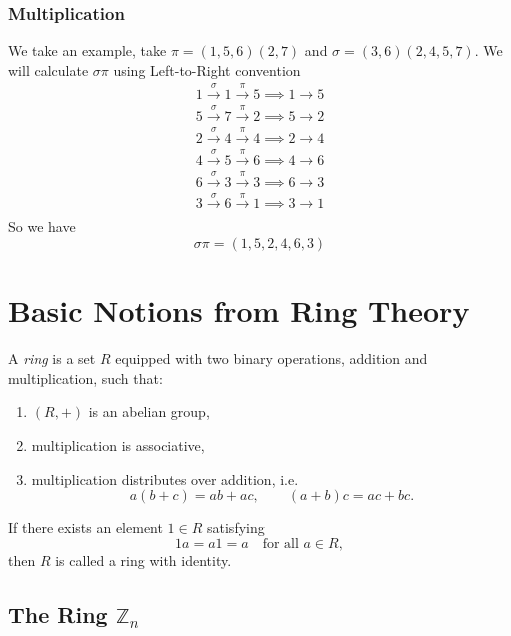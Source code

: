 \documentclass[a4paper,12pt]{article}
\theoremstyle{definition}
\begin{document}
\subsubsection*{Multiplication}
We take an example, take $\pi = (1,5,6)(2,7)$ and $\sigma = (3,6)(2,4,5,7)$. We will calculate $\sigma\pi$ using Left-to-Right convention
\begin{gather*}
1 \xrightarrow{\sigma} 1 \xrightarrow{\pi} 5 \implies 1 \to 5 \\
5 \xrightarrow{\sigma} 7 \xrightarrow{\pi} 2 \implies 5 \to 2 \\
2 \xrightarrow{\sigma} 4 \xrightarrow{\pi} 4 \implies 2 \to 4 \\
4 \xrightarrow{\sigma} 5 \xrightarrow{\pi} 6 \implies 4 \to 6 \\
6 \xrightarrow{\sigma} 3 \xrightarrow{\pi} 3 \implies 6 \to 3 \\
3 \xrightarrow{\sigma} 6 \xrightarrow{\pi} 1 \implies 3 \to 1 \\
\end{gather*}
So we have 
\[ \sigma\pi = (1, 5, 2, 4, 6, 3) \]

\newpage
\appendix
\section{Basic Notions from Ring Theory}

A \emph{ring} is a set $R$ equipped with two binary operations, addition and multiplication, such that:

\begin{enumerate}
\item $(R,+)$ is an abelian group,
\item multiplication is associative,
\item multiplication distributes over addition, i.e.
\begin{equation*}
a(b+c)=ab+ac, \qquad (a+b)c=ac+bc.
\end{equation*}
\end{enumerate}

If there exists an element $1 \in R$ satisfying
\begin{equation*}
1a = a1 = a \quad \text{for all } a \in R,
\end{equation*}
then $R$ is called a ring with identity.

\subsection{The Ring \texorpdfstring{$\mathbb{Z}_n$}{Z_n}}
\end{document}
